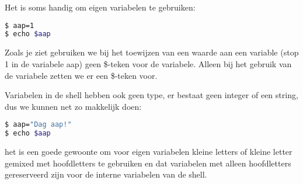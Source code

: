 Het is soms handig om eigen variabelen te gebruiken:

\begin{lstlisting}[language=bash]
$ aap=1
$ echo $aap
\end{lstlisting}

Zoals je ziet gebruiken we bij het toewijzen van een waarde aan een variable (stop 1 in de variabele aap) geen \$-teken voor de variabele. Alleen bij het gebruik van de variabele zetten we er een \$-teken voor.

Variabelen in de shell hebben ook geen type, er bestaat geen integer of een string, dus we kunnen net zo makkelijk
doen:

\begin{lstlisting}[language=bash]
$ aap="Dag aap!"
$ echo $aap
\end{lstlisting}

het is een goede gewoonte om voor eigen variabelen kleine letters of kleine letter gemixed met hoofdletters te gebruiken en dat variabelen met alleen hoofdletters gereserveerd zijn voor de interne variabelen van de shell.


